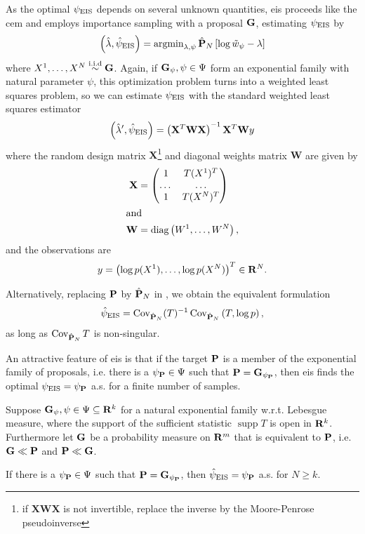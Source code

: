 As the optimal $\peis$ depends on several unknown quantities, \gls{eis} proceeds like the \gls{cem} and employs importance sampling with a proposal $\G$, estimating $\peis$ by
$$
\left(\hat \lambda,\hat \psi_{\text{EIS}}\right) = \argmin_{\lambda,\psi} \hat\P_{N} \left[ \log \tilde w_{\psi} - \lambda \right]
$$
where $X^{1}, \dots, X^{N} \iid \G$. 
Again, if $\G_{\psi}, \psi \in \Psi$ form an exponential family with natural parameter $\psi$, this optimization problem turns into a weighted least squares problem, so we can estimate $\peis$ with the standard weighted least squares estimator
$$
\left( \hat\lambda', \hpeis \right) = \left(\mathbf X^{T}\mathbf W\mathbf X\right)^{-1}\mathbf X^{T}\mathbf W y%
$$
where the random design matrix $\mathbf X$\footnote{if $\mathbf X\mathbf W \mathbf X$ is not invertible, replace the inverse by the Moore-Penrose pseudoinverse} and diagonal weights matrix $\mathbf W$ are given by
\begin{align*}
\mathbf X &= \begin{pmatrix}
    1 & T(X^{1})^{T} \\
    \dots&\dots\\
    1 & T(X^{N})^{T} \\
\end{pmatrix}\\
\intertext{and}
\mathbf W &= \text{diag} \left( W^{1}, \dots, W^{N} \right),
\end{align*}
and the observations are 
\begin{align*}
y = \left( \log p(X^{1}), \dots, \log p(X^{N}) \right)^{T} \in \R^{N}.
\end{align*}

Alternatively, replacing $\P$ by $\hat\P_{N}$ in , we obtain the equivalent formulation
\begin{align}
    \label{eq:hpeis-cov}
    \hpeis = \cov_{\hat\P_{N}} (T)^{-1} \cov_{\hat \P_{N}} \left( T, \log p \right),
\end{align}
as long as $\cov_{\hat \P_{N}} T$ is non-singular.

An attractive feature of \gls{eis} is that if the target $\P$ is a member of the exponential family of proposals, i.e. there is a $\psi_{\P}\in\Psi$ such that $\P = \G_{\psi_{\P}}$, then \gls{eis} finds the optimal $\peis = \psi_{\P}$ a.s. for a finite number of samples.

\begin{proposition}
    \label{prop:eis-finite-sample}
    Suppose $\G_{\psi}, \psi \in \Psi \subseteq \R^{k}$ for a natural exponential family w.r.t. Lebesgue measure, where the support of the sufficient statistic $\operatorname{supp} T$ is open in $\R^{k}$. 
    Furthermore let $\G$ be a probability measure on $\R^{m}$ that is equivalent to $\P$, i.e. $\G \ll \P$ and $\P \ll \G$. 

    If there is a $\psi_{\P} \in \Psi$ such that $\P = \G_{\psi_{\P}}$, then $\hpeis = \psi_{\P}$ a.s. for $N \geq k$. 
\end{proposition}

